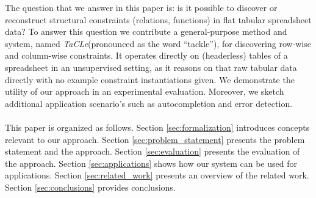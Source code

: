 \documentclass{IEEEtran}
\newcommand{\tias}[1]{\textcolor{blue}{{\sc Tias:} #1}\xspace}
\newcommand{\format}[1]{\textit{#1}\xspace}
\newcommand{\sname}{\format{TaCLe}}
\theoremstyle{definition}
\begin{document}
The question that we answer in this paper is: is it possible to discover or reconstruct structural constraints (relations, functions) in flat tabular spreadsheet data?
To answer this question we contribute a general-purpose method and system, named \sname (pronounced as the word ``tackle''), for discovering row-wise and column-wise constraints.
It operates directly on (headerless) tables of a spreadsheet in an unsupervised setting, as it reasons on that raw tabular data directly with no example constraint instantiations given. %
We demonstrate the utility of our approach in an experimental evaluation.
Moreover, we sketch additional application scenario's such as autocompletion and error detection.
\\\\
This paper is organized as follows.
Section \ref{sec:formalization} introduces concepts relevant to our approach. Section \ref{sec:problem_statement} presents the problem statement and the approach. Section \ref{sec:evaluation} presents the evaluation of the approach. Section \ref{sec:applications} shows how our system can be used for applications. Section \ref{sec:related_work} presents an overview of the related work. Section \ref{sec:conclusions} provides conclusions.


\end{document}
